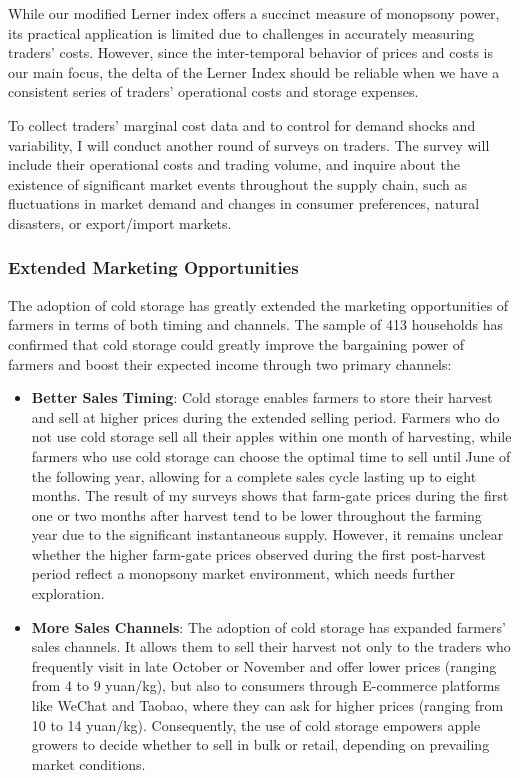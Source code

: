 While our modified Lerner index offers a succinct measure of monopsony power, its practical application is limited due to challenges in accurately measuring traders' costs. However, since the inter-temporal behavior of prices and costs is our main focus, the delta of the Lerner Index should be reliable when we have a consistent series of traders' operational costs and storage expenses. 

To collect traders' marginal cost data and to control for demand shocks and variability, I will conduct another round of surveys on traders. The survey will include their operational costs and trading volume, and inquire about the existence of significant market events throughout the supply chain, such as fluctuations in market demand and changes in consumer preferences, natural disasters, or export/import markets.


\subsubsection{Extended Marketing Opportunities}
\noindent The adoption of cold storage has greatly extended the marketing opportunities of farmers in terms of both timing and channels. The sample of 413 households has confirmed that cold storage could greatly improve the bargaining power of farmers and boost their expected income through two primary channels:
\begin{itemize}
    \item \textbf{Better Sales Timing}: Cold storage enables farmers to store their harvest and sell at higher prices during the extended selling period. Farmers who do not use cold storage sell all their apples within one month of harvesting, while farmers who use cold storage can choose the optimal time to sell until June of the following year, allowing for a complete sales cycle lasting up to eight months. The result of my surveys shows that farm-gate prices during the first one or two months after harvest tend to be lower throughout the farming year due to the significant instantaneous supply. However, it remains unclear whether the higher farm-gate prices observed during the first post-harvest period reflect a monopsony market environment, which needs further exploration.
    
    \item \textbf{More Sales Channels}: The adoption of cold storage has expanded farmers' sales channels. It allows them to sell their harvest not only to the traders who frequently visit in late October or November and offer lower prices (ranging from 4 to 9 yuan/kg), but also to consumers through E-commerce platforms like WeChat and Taobao, where they can ask for higher prices (ranging from 10 to 14 yuan/kg). Consequently, the use of cold storage empowers apple growers to decide whether to sell in bulk or retail, depending on prevailing market conditions.
\end{itemize}


